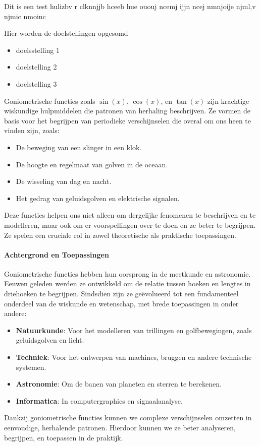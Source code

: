 \documentclass{ximera}
\begin{document}
\begin{template*}
   Dit is een test hulizbv r clknnjjb hceeb hue ououj ncemj ijjn ncej nmnjoije njml,v njmic nmoinc 
\end{template*}
    



\begin{template}
Hier worden de doelstellingen opgesomd
\begin{itemize}
    \item doelsstelling 1
    \item doelstelling 2
    \item doelstelling 3
\end{itemize}
\end{template}


Goniometrische functies zoals \(\sin(x)\), \(\cos(x)\), en \(\tan(x)\) zijn krachtige wiskundige hulpmiddelen die patronen van herhaling beschrijven. Ze vormen de basis voor het begrijpen van periodieke verschijnselen die overal om ons heen te vinden zijn, zoals:
\begin{itemize}
    \item De beweging van een slinger in een klok.
    \item De hoogte en regelmaat van golven in de oceaan.
    \item De wisseling van dag en nacht.
    \item Het gedrag van geluidsgolven en elektrische signalen.
\end{itemize}
Deze functies helpen ons niet alleen om dergelijke fenomenen te beschrijven en te modelleren, maar ook om er voorspellingen over te doen en ze beter te begrijpen. Ze spelen een cruciale rol in zowel theoretische als praktische toepassingen.

\paragraph*{Achtergrond en Toepassingen} 
Goniometrische functies hebben hun oorsprong in de meetkunde en astronomie. Eeuwen geleden werden ze ontwikkeld om de relatie tussen hoeken en lengtes in driehoeken te begrijpen. Sindsdien zijn ze geëvolueerd tot een fundamenteel onderdeel van de wiskunde en wetenschap, met brede toepassingen in onder andere:

\begin{itemize}
    \item \textbf{Natuurkunde}: Voor het modelleren van trillingen en golfbewegingen, zoals geluidsgolven en licht.
    \item \textbf{Techniek}: Voor het ontwerpen van machines, bruggen en andere technische systemen.
    \item \textbf{Astronomie}: Om de banen van planeten en sterren te berekenen.
    \item \textbf{Informatica}: In computergraphics en signaalanalyse.
\end{itemize}

Dankzij goniometrische functies kunnen we complexe verschijnselen omzetten in eenvoudige, herhalende patronen. Hierdoor kunnen we ze beter analyseren, begrijpen, en toepassen in de praktijk.
\end{document}

